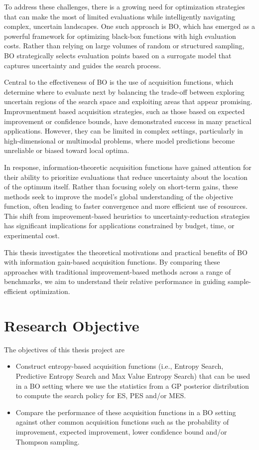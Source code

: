 \documentclass{ut-thesis}
\begin{document}
To address these challenges, there is a growing need for optimization strategies that can make the most of limited evaluations while intelligently navigating complex, uncertain landscapes. One such approach is BO, which has emerged as a powerful framework for optimizing black-box functions with high evaluation costs. Rather than relying on large volumes of random or structured sampling, BO strategically selects evaluation points based on a surrogate model that captures uncertainty and guides the search process.

Central to the effectiveness of BO is the use of acquisition functions, which determine where to evaluate next by balancing the trade-off between exploring uncertain regions of the search space and exploiting areas that appear promising. Improvmentment based acquisition strategies, such as those based on expected improvement or confidence bounds, have demonstrated success in many practical applications. However, they can be limited in complex settings, particularly in high-dimensional or multimodal problems, where model predictions become unreliable or biased toward local optima.

In response, information-theoretic acquisition functions have gained attention for their ability to prioritize evaluations that reduce uncertainty about the location of the optimum itself. Rather than focusing solely on short-term gains, these methods seek to improve the model’s global understanding of the objective function, often leading to faster convergence and more efficient use of resources. This shift from improvement-based heuristics to uncertainty-reduction strategies has significant implications for applications constrained by budget, time, or experimental cost.

This thesis investigates the theoretical motivations and practical benefits of BO with information gain-based acquisition functions. By comparing these approaches with traditional improvement-based methods across a range of benchmarks, we aim to understand their relative performance in guiding sample-efficient optimization.

\section{Research Objective}

The objectives of this thesis project are

\begin{itemize}
    \item Construct entropy-based acquisition functions (i.e., Entropy Search, Predictive Entropy Search and Max Value Entropy Search) that can be used in a BO setting where we use the statistics from a GP posterior distribution to compute the search policy for ES, PES and/or MES.
    \item Compare the performance of these acquisition functions in a BO setting against other common acquisition functions such as the probability of improvement, expected improvement, lower confidence bound and/or Thompson sampling.
\end{itemize}
\end{document}
